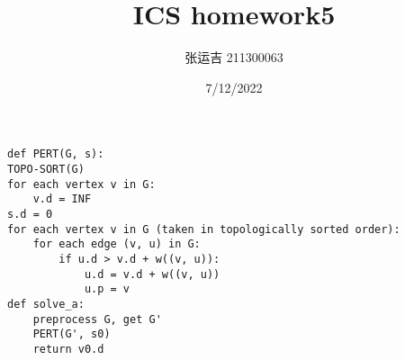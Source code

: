 \documentclass{article}
\title{ICS homework5}
\author{张运吉 211300063}
\date{7/12/2022}
\begin{document}
 
\maketitle %

\lstset{language=python}
\begin{lstlisting}
def PERT(G, s):
TOPO-SORT(G)
for each vertex v in G:
    v.d = INF
s.d = 0
for each vertex v in G (taken in topologically sorted order):
    for each edge (v, u) in G:
        if u.d > v.d + w((v, u)):
            u.d = v.d + w((v, u))
            u.p = v
def solve_a:
    preprocess G, get G'
    PERT(G', s0)
    return v0.d

\end{lstlisting}
\end{document}

